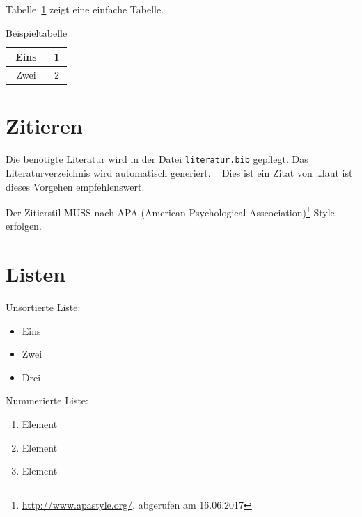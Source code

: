 \bigskip

\noindent
Tabelle~\ref{tab:beispieltabelle} zeigt eine einfache Tabelle.

\begin{table}[hbtp]
  \begin{center}
    \begin{tabular}{|c|c|}
      \hline 
      \rule[-1ex]{0pt}{2.5ex} Eins & 1 \\ 
      \hline 
      \rule[-1ex]{0pt}{2.5ex} Zwei & 2 \\ 
      \hline
    \end{tabular}
  \end{center}
  \caption{Beispieltabelle}
  \label{tab:beispieltabelle}
\end{table}

\section{Zitieren}

Die benötigte Literatur wird in der Datei \texttt{literatur.bib} gepflegt. Das Literaturverzeichnis wird automatisch generiert.
\ \citation
Dies ist ein Zitat von \citep*{Eckert2014} \dots laut \cite[Seite~42]{Eckert2014} ist dieses Vorgehen empfehlenswert.

\noindent
Der Zitierstil MUSS nach APA (American Psychological Asscociation)\footnote{\url{http://www.apastyle.org/}, abgerufen am 16.06.2017}
Style erfolgen.

\section{Listen}

Unsortierte Liste:

\begin{itemize}
 \item Eins
 \item Zwei
 \item Drei
\end{itemize}

\bigskip

\noindent
Nummerierte Liste:

\begin{enumerate}
 \item Element
 \item Element
 \item Element
\end{enumerate}

\indent